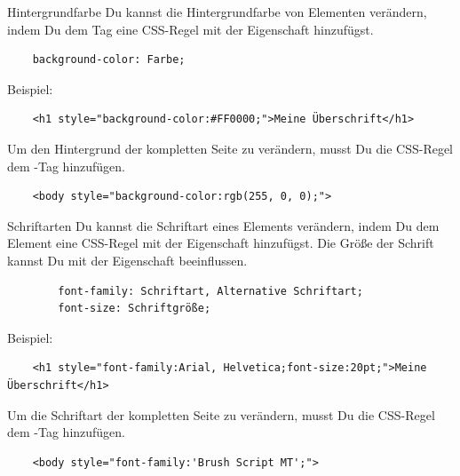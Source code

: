 \documentclass[lerntheke,12pt,a5paper,landscape]{arbeitsblatt}
\begin{document}
\begin{karte1}{Hintergrundfarbe}
	Du kannst die Hintergrundfarbe von Elementen verändern, indem Du dem Tag eine CSS-Regel mit der Eigenschaft  hinzufügst.

	\begin{verbatim}
	background-color: Farbe;
	\end{verbatim}

	Beispiel:
	\begin{verbatim}
	<h1 style="background-color:#FF0000;">Meine Überschrift</h1>
	\end{verbatim}

	Um den Hintergrund der kompletten Seite zu verändern, musst Du die CSS-Regel dem -Tag hinzufügen.

	\begin{verbatim}
	<body style="background-color:rgb(255, 0, 0);">
	\end{verbatim}
\end{karte1}

\leereKarte

\begin{karte1}{Schriftarten}
	Du kannst die Schriftart eines Elements verändern, indem Du dem Element eine CSS-Regel mit der Eigenschaft  hinzufügst. Die Größe der Schrift kannst Du mit der Eigenschaft  beeinflussen.

	\begin{verbatim}
		font-family: Schriftart, Alternative Schriftart;
		font-size: Schriftgröße;
	\end{verbatim}

	Beispiel:
	\begin{verbatim}
	<h1 style="font-family:Arial, Helvetica;font-size:20pt;">Meine Überschrift</h1>
	\end{verbatim}

	Um die Schriftart der kompletten Seite zu verändern, musst Du die CSS-Regel dem -Tag hinzufügen.

	\begin{verbatim}
	<body style="font-family:'Brush Script MT';">
	\end{verbatim}
\end{karte1}
\end{document}
